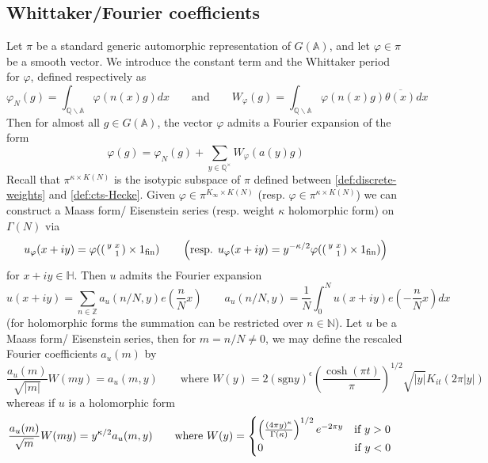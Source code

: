 \documentclass{article}
\numberwithin{equation}{section}
\begin{document}
\subsection{Whittaker/Fourier coefficients} Let $\pi$ be a standard generic automorphic representation of $G(\mathbb{A})$, and let $\varphi \in \pi$ be a smooth vector. We introduce the constant term and the Whittaker period for $\varphi$, defined respectively as
$$\varphi_N(g)=\int_{\mathbb{Q}\backslash \mathbb{A}}\varphi(n(x)g)dx \qquad \text{and}\qquad W_\varphi(g)=\int_{\mathbb{Q}\backslash \mathbb{A}}\varphi(n(x)g)\overline{\theta (x)}dx$$
Then for almost all $g \in G(\mathbb{A})$, the vector $\varphi$ admits a Fourier expansion of the form
\begin{equation}
    \varphi(g)=\varphi_N(g)+\sum_{y \in \mathbb{Q}^\times}W_\varphi(a(y)g)
\end{equation}
Recall that $\pi^{\kappa\times K(N)}$ is the isotypic subspace of $\pi$ defined between \eqref{def:discrete-weights} and \eqref{def:cts-Hecke}. Given $\varphi \in \pi^{K_\infty \times K(N)}$ (resp. $\varphi \in \pi^{\kappa \times K(N)}$) we can construct a Maass form/ Eisenstein series (resp. weight $\kappa$ holomorphic form) on $\Gamma(N)$ via
$$u_\varphi(x+iy)=\varphi(\begin{psmallmatrix}
    y & x \\ & 1
\end{psmallmatrix} \times 1_\text{fin}) \qquad \left(\text{resp. } u_\varphi(x+iy)=y^{-\kappa/2}\varphi(\begin{psmallmatrix}
    y & x \\ & 1
\end{psmallmatrix} \times 1_\text{fin})\right)$$
for $x+iy \in \mathbb{H}$. Then $u$ admits the Fourier expansion
\begin{equation}
    u(x+iy)=\sum_{n \in \mathbb{Z}}a_u(n/N,y)e(\frac{n}{N}x) \qquad a_u(n/N,y)=\frac{1}{N}\int_0^N u(x+iy)e\left(-\frac{n}{N}x\right)dx
\end{equation}
(for holomorphic forms the summation can be restricted over $n \in \mathbb{N}$). Let $u$ be a Maass form/ Eisenstein series, then
for $m = n/N \neq 0$, we may define the rescaled Fourier coefficients $a_u(m)$ by
\begin{equation}\label{def:maasscoefficients}
    \frac{a_u(m)}{\sqrt{|m|}}W(my)=a_u(m,y) \qquad \text{where } W(y)=2(\text{sgn}y)^\epsilon \left(\frac{\cosh (\pi t)}{\pi}\right)^{1/2}\sqrt{|y|}K_{it}(2\pi |y|)
\end{equation}
whereas if $u$ is a holomorphic form
\begin{equation}\label{def:holomorphic-coefficients}
    \frac{a_u(m)}{\sqrt{m}}W(my)=y^{\kappa/2}a_u(m,y) \qquad \text{where } W(y)=\begin{cases} \left(\frac{(4\pi y)^\kappa}{\Gamma(\kappa)}\right)^{1/2}e^{-2\pi y} \quad \text{if }y>0 \\
        0 \hspace{2.9cm} \text{if }y<0
    \end{cases}
\end{equation}
\end{document}

